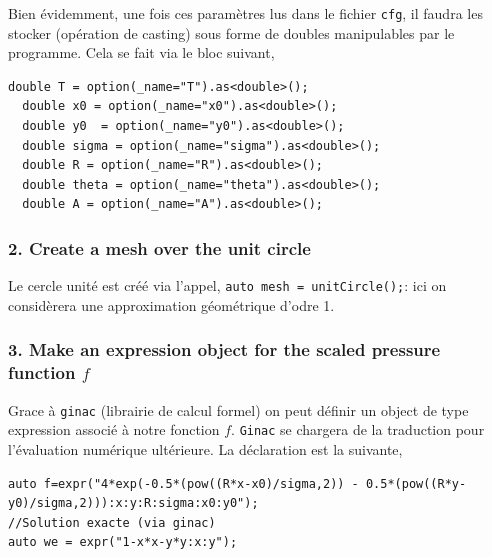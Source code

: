 \documentclass[a4paper,oneside,10pt]{report}
\begin{document}
Bien évidemment, une fois ces paramètres lus dans le fichier \texttt{cfg}, il faudra les stocker (opération de casting) sous forme de doubles manipulables par le programme. Cela se fait via le bloc suivant,

\begin{center}
\begin{minipage}{\textwidth}
\begin{lstlisting}[label=code2,caption=membrane.cpp - cast des options]
  double T = option(_name="T").as<double>();
  double x0 = option(_name="x0").as<double>(); 
  double y0  = option(_name="y0").as<double>();
  double sigma = option(_name="sigma").as<double>();
  double R = option(_name="R").as<double>();
  double theta = option(_name="theta").as<double>();
  double A = option(_name="A").as<double>();
\end{lstlisting}
\end{minipage}
\end{center}

\subsubsection{2. Create a mesh over the unit circle}

Le cercle unité est créé via l'appel, \texttt{auto mesh = unitCircle();}:  ici on considèrera une approximation géométrique d'odre 1.

\subsubsection{3. Make an expression object for the scaled pressure function $f$}

Grace à \texttt{ginac} (librairie de calcul formel) on peut définir un object de type expression associé à notre fonction $f$. \texttt{Ginac} se chargera de la traduction pour l'évaluation numérique ultérieure. La déclaration est la suivante,
\begin{center}
\begin{minipage}{\textwidth}
\begin{lstlisting}[label=code2,caption=membrane.cpp - fonction f via Ginac expression]
auto f=expr("4*exp(-0.5*(pow((R*x-x0)/sigma,2)) - 0.5*(pow((R*y-y0)/sigma,2))):x:y:R:sigma:x0:y0"); 
//Solution exacte (via ginac)
auto we = expr("1-x*x-y*y:x:y");
\end{lstlisting}
\end{minipage}
\end{center}
\end{document}
